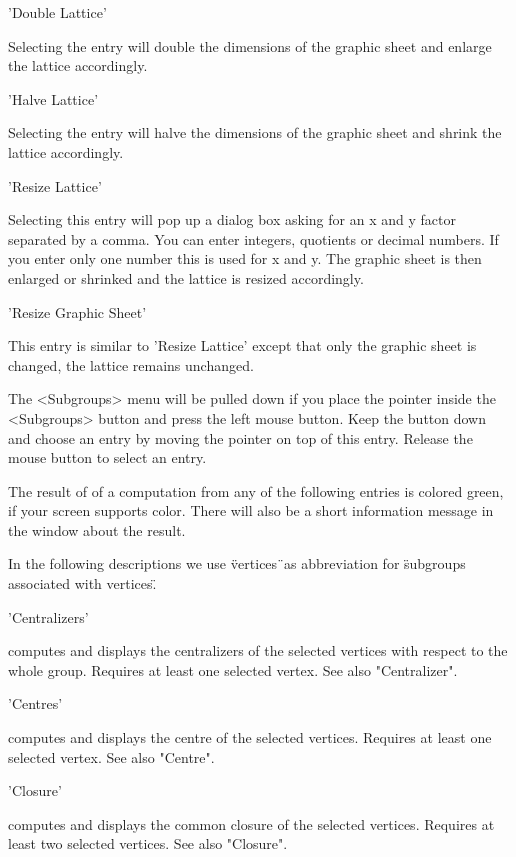'Double Lattice'

Selecting the entry will  double the dimensions  of the graphic sheet and
enlarge the lattice accordingly.

'Halve Lattice'

Selecting  the entry will halve the  dimensions  of the graphic sheet and
shrink the lattice accordingly.

'Resize Lattice'

Selecting  this entry will  pop up a dialog   box asking for   an x and y
factor  separated by  a comma.   You   can enter integers,  quotients  or
decimal numbers. If you enter only  one number this is used  for x and y.
The graphic sheet is then enlarged or shrinked and the lattice is resized
accordingly.

'Resize Graphic Sheet'

This  entry is similar to 'Resize  Lattice' except that  only the graphic
sheet is changed, the lattice remains unchanged.


The <Subgroups> menu will be pulled down  if you place the pointer inside
the <Subgroups> button and press the left mouse  button.  Keep the button
down and choose an entry   by moving the pointer  on  top of this  entry.
Release the mouse button to select an entry.

The result   of of a computation from   any of the  following  entries is
colored green, if your screen supports color.  There will also be a short
information message in the {\GAP} window about the result.

In the following descriptions   we use \"vertices\"\ as abbreviation  for
\"subgroups associated with vertices\".

'Centralizers'

computes  and displays the   centralizers of  the selected  vertices with
respect to the whole group.  Requires at  least one selected vertex.  See
also "Centralizer".

'Centres'

computes and displays  the centre of  the selected vertices.  Requires at
least one selected vertex. See also "Centre".

'Closure'

computes and    displays the common  closure  of  the  selected vertices.
Requires at least two selected vertices. See also "Closure".

